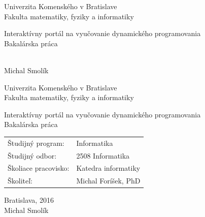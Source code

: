 \documentclass[12pt, oneside]{book}
\def\mfrok{2016}
\def\mfnazov{Interaktívny portál na vyučovanie dynamického programovania}
\def\mftyp{Bakalárska práca}
\def\mfautor{Michal Smolík}
\def\mfskolitel{Michal Foríšek, PhD }
\def\mfmiesto{Bratislava, \mfrok}
\def\mfodbor{2508 Informatika}
\def\program{ Informatika }
\def\mfpracovisko{ Katedra informatiky }
\begin{document}
\nobibliography*
\thispagestyle{empty}

\begin{center}
\sc\large
Univerzita Komenského v Bratislave\\
Fakulta matematiky, fyziky a informatiky

\vfill

{\LARGE\mfnazov}\\
\mftyp
\end{center}

\vfill

{\sc\large
\noindent \mfrok\\
\mfautor
}

\eject %


\thispagestyle{empty}
\noindent

\begin{center}
\sc
\large
Univerzita Komenského v Bratislave\\
Fakulta matematiky, fyziky a informatiky

\vfill

{\LARGE\mfnazov}\\
\mftyp
\end{center}

\vfill

\noindent
\begin{tabular}{ll}
Študijný program: & \program \\
Študijný odbor: & \mfodbor \\
Školiace pracovisko: & \mfpracovisko \\
Školiteľ: & \mfskolitel \\
\end{tabular}

\vfill


\noindent \mfmiesto\\
\mfautor

\eject %




\end{document}
